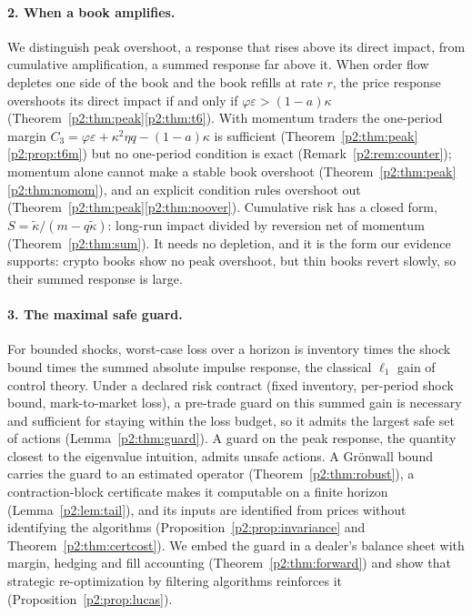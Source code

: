 \paragraph{2. When a book amplifies.} We distinguish peak overshoot, a response that rises above its direct impact, from cumulative amplification, a summed response far above it. When order flow depletes one side of the book and the book refills at rate $r$, the price response overshoots its direct impact if and only if $\varphi\varepsilon>(1-a)\kappa$ (Theorem~\ref{p2:thm:peak}\ref{p2:thm:t6}). With momentum traders the one-period margin $C_3=\varphi\varepsilon+\kappa^2\eta q-(1-a)\kappa$ is sufficient (Theorem~\ref{p2:thm:peak}\ref{p2:prop:t6m}) but no one-period condition is exact (Remark~\ref{p2:rem:counter}); momentum alone cannot make a stable book overshoot (Theorem~\ref{p2:thm:peak}\ref{p2:thm:nomom}), and an explicit condition rules overshoot out (Theorem~\ref{p2:thm:peak}\ref{p2:thm:noover}). Cumulative risk has a closed form, $S=\tilde\kappa/(m-q\tilde\kappa)$: long-run impact divided by reversion net of momentum (Theorem~\ref{p2:thm:sum}). It needs no depletion, and it is the form our evidence supports: crypto books show no peak overshoot, but thin books revert slowly, so their summed response is large.

\paragraph{3. The maximal safe guard.} For bounded shocks, worst-case loss over a horizon is inventory times the shock bound times the summed absolute impulse response, the classical $\ell_1$ gain of control theory. Under a declared risk contract (fixed inventory, per-period shock bound, mark-to-market loss), a pre-trade guard on this summed gain is necessary and sufficient for staying within the loss budget, so it admits the largest safe set of actions (Lemma~\ref{p2:thm:guard}). A guard on the peak response, the quantity closest to the eigenvalue intuition, admits unsafe actions. A Gr\"onwall bound carries the guard to an estimated operator (Theorem~\ref{p2:thm:robust}), a contraction-block certificate makes it computable on a finite horizon (Lemma~\ref{p2:lem:tail}), and its inputs are identified from prices without identifying the algorithms (Proposition~\ref{p2:prop:invariance} and Theorem~\ref{p2:thm:certcost}). We embed the guard in a dealer's balance sheet with margin, hedging and fill accounting (Theorem~\ref{p2:thm:forward}) and show that strategic re-optimization by filtering algorithms reinforces it (Proposition~\ref{p2:prop:lucas}).

